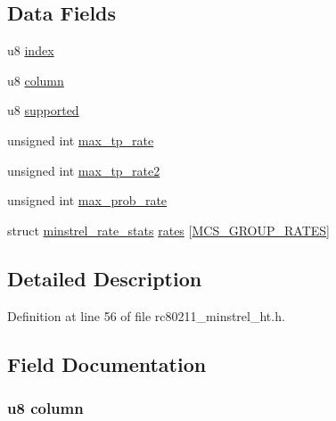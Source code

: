 \subsection*{Data Fields}
\begin{DoxyCompactItemize}
\item 
u8 \hyperlink{structminstrel__mcs__group__data_aa93030ce4aadb2b3f398bfd4a3eda31b}{index}
\item 
u8 \hyperlink{structminstrel__mcs__group__data_a6ffd56a9561c5ba0bbaff28953dc76e1}{column}
\item 
u8 \hyperlink{structminstrel__mcs__group__data_ab33658d674b728098d19eee1209991a6}{supported}
\item 
unsigned int \hyperlink{structminstrel__mcs__group__data_ae61b14461f5cfea710f666fe40906493}{max\-\_\-tp\-\_\-rate}
\item 
unsigned int \hyperlink{structminstrel__mcs__group__data_aaa4f3e0147c91173f7dd6d86b82ba0ee}{max\-\_\-tp\-\_\-rate2}
\item 
unsigned int \hyperlink{structminstrel__mcs__group__data_a4a4625871f05851116acae11b392a957}{max\-\_\-prob\-\_\-rate}
\item 
struct \hyperlink{structminstrel__rate__stats}{minstrel\-\_\-rate\-\_\-stats} \hyperlink{structminstrel__mcs__group__data_a4b803dc8a89936e90c219388274fec2b}{rates} \mbox{[}\hyperlink{rc80211__minstrel__ht_8h_a1cce97ab419153d65e970112b74b5655}{M\-C\-S\-\_\-\-G\-R\-O\-U\-P\-\_\-\-R\-A\-T\-E\-S}\mbox{]}
\end{DoxyCompactItemize}


\subsection{Detailed Description}


Definition at line 56 of file rc80211\-\_\-minstrel\-\_\-ht.\-h.



\subsection{Field Documentation}
\hypertarget{structminstrel__mcs__group__data_a6ffd56a9561c5ba0bbaff28953dc76e1}{
\subsubsection[{column}]{\setlength{\rightskip}{0pt plus 5cm}u8 column}}\label{structminstrel__mcs__group__data_a6ffd56a9561c5ba0bbaff28953dc76e1}



